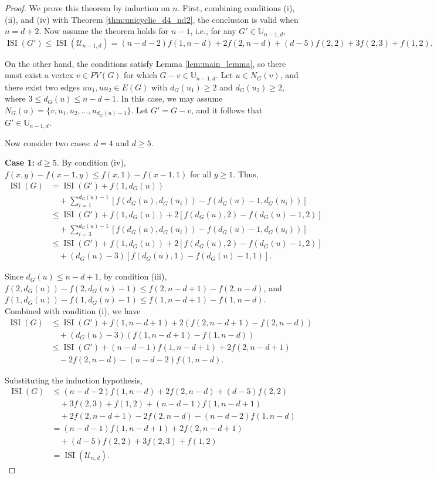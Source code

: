 \documentclass[12pt]{article}
\theoremstyle{definition}
\newcommand{\ISI}{\operatorname{ISI}}
\newcommand{\UU}{\mathbb{U}}
\begin{document}
\begin{proof}
We prove this theorem by induction on \(n\). First, combining conditions (i), (ii), and (iv) with Theorem \ref{thm:unicyclic_d4_nd2}, the conclusion is valid when \(n = d+2\). Now assume the theorem holds for \(n-1\), i.e., for any \(G' \in \UU_{n-1,d}\),
\[
\ISI(G') \leq \ISI(\mathcal{U}_{n-1,d}) = (n-d-2)f(1,n-d) + 2f(2,n-d) + (d-5)f(2,2) + 3f(2,3) + f(1,2).
\]

On the other hand, the conditions satisfy Lemma \ref{lem:main_lemma}, so there must exist a vertex \(v \in PV(G)\) for which \(G - v \in \UU_{n-1,d}\). Let \(u \in N_G(v)\), and there exist two edges \(uu_1, uu_2 \in E(G)\) with \(d_G(u_1) \geq 2\) and \(d_G(u_2) \geq 2\), where \(3 \leq d_G(u) \leq n-d+1\). In this case, we may assume \(N_G(u) = \{v, u_1, u_2, \ldots, u_{d_G(u)-1}\}\). Let \(G' = G - v\), and it follows that \(G' \in \UU_{n-1,d}\).

Now consider two cases: \(d = 4\) and \(d \geq 5\).

\textbf{Case 1:} \(d \geq 5\). By condition (iv), \(f(x,y) - f(x-1,y) \leq f(x,1) - f(x-1,1)\) for all \(y \geq 1\). Thus,
\begin{align*}
\ISI(G) &= \ISI(G') + f(1,d_G(u)) \\
&\quad + \sum_{i=1}^{d_G(u)-1} [f(d_G(u), d_G(u_i)) - f(d_G(u)-1, d_G(u_i))] \\[4pt]
&\leq \ISI(G') + f(1,d_G(u)) + 2[f(d_G(u),2) - f(d_G(u)-1,2)] \\
&\quad + \sum_{i=3}^{d_G(u)-1} [f(d_G(u), d_G(u_i)) - f(d_G(u)-1, d_G(u_i))] \\[4pt]
&\leq \ISI(G') + f(1,d_G(u)) + 2[f(d_G(u),2) - f(d_G(u)-1,2)] \\
&\quad + (d_G(u)-3)[f(d_G(u),1) - f(d_G(u)-1,1)].
\end{align*}

Since \(d_G(u) \leq n-d+1\), by condition (iii), \(f(2,d_G(u)) - f(2,d_G(u)-1) \leq f(2,n-d+1) - f(2,n-d)\), and \(f(1,d_G(u)) - f(1,d_G(u)-1) \leq f(1,n-d+1) - f(1,n-d)\). Combined with condition (i), we have
\begin{align*}
\ISI(G) &\leq \ISI(G') + f(1,n-d+1) + 2(f(2,n-d+1) - f(2,n-d)) \\
&\quad + (d_G(u)-3)(f(1,n-d+1) - f(1,n-d)) \\[4pt]
&\leq \ISI(G') + (n-d-1)f(1,n-d+1) + 2f(2,n-d+1) \\
&\quad - 2f(2,n-d) - (n-d-2)f(1,n-d).
\end{align*}

Substituting the induction hypothesis,
\begin{align*}
\ISI(G) &\leq (n-d-2)f(1,n-d) + 2f(2,n-d) + (d-5)f(2,2) \\
&\quad + 3f(2,3) + f(1,2) + (n-d-1)f(1,n-d+1) \\
&\quad + 2f(2,n-d+1) - 2f(2,n-d) - (n-d-2)f(1,n-d) \\[4pt]
&= (n-d-1)f(1,n-d+1) + 2f(2,n-d+1) \\
&\quad + (d-5)f(2,2) + 3f(2,3) + f(1,2) \\[4pt]
&= \ISI(\mathcal{U}_{n,d}).
\end{align*}


\end{proof}
\end{document}
